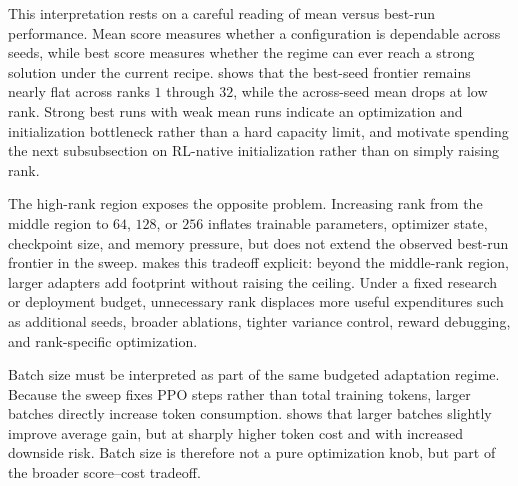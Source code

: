 This interpretation rests on a careful reading of mean versus best-run performance. Mean score measures whether a configuration is dependable across seeds, while best score measures whether the regime can ever reach a strong solution under the current recipe.  shows that the best-seed frontier remains nearly flat across ranks $1$ through $32$, while the across-seed mean drops at low rank. Strong best runs with weak mean runs indicate an optimization and initialization bottleneck rather than a hard capacity limit, and motivate spending the next subsubsection on RL-native initialization rather than on simply raising rank.


The high-rank region exposes the opposite problem. Increasing rank from the middle region to $64$, $128$, or $256$ inflates trainable parameters, optimizer state, checkpoint size, and memory pressure, but does not extend the observed best-run frontier in the sweep.  makes this tradeoff explicit: beyond the middle-rank region, larger adapters add footprint without raising the ceiling. Under a fixed research or deployment budget, unnecessary rank displaces more useful expenditures such as additional seeds, broader ablations, tighter variance control, reward debugging, and rank-specific optimization.


Batch size must be interpreted as part of the same budgeted adaptation regime. Because the sweep fixes PPO steps rather than total training tokens, larger batches directly increase token consumption.  shows that larger batches slightly improve average gain, but at sharply higher token cost and with increased downside risk. Batch size is therefore not a pure optimization knob, but part of the broader score--cost tradeoff.


